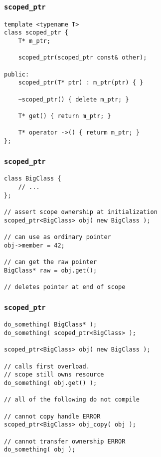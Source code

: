 \begin{frame}[fragile]
    \frametitle{\texttt{scoped\_ptr}}
    \begin{lstlisting}[title=Implementation]
template <typename T>
class scoped_ptr {
    T* m_ptr;

    scoped_ptr(scoped_ptr const& other);

public:
    scoped_ptr(T* ptr) : m_ptr(ptr) { }

    ~scoped_ptr() { delete m_ptr; }

    T* get() { return m_ptr; }

    T* operator ->() { returm m_ptr; }
};
    \end{lstlisting}
\end{frame}

\begin{frame}[fragile]
    \frametitle{\texttt{scoped\_ptr}}
    \begin{lstlisting}[title=Usage]
class BigClass {
    // ...
};

// assert scope ownership at initialization
scoped_ptr<BigClass> obj( new BigClass );

// can use as ordinary pointer
obj->member = 42;

// can get the raw pointer
BigClass* raw = obj.get();

// deletes pointer at end of scope
    \end{lstlisting}
\end{frame}


\begin{frame}[fragile]
    \frametitle{\texttt{scoped\_ptr}}
    \begin{lstlisting}[title=Compile time enforcement]
do_something( BigClass* );
do_something( scoped_ptr<BigClass> );

scoped_ptr<BigClass> obj( new BigClass );

// calls first overload.
// scope still owns resource
do_something( obj.get() );

// all of the following do not compile

// cannot copy handle ERROR
scoped_ptr<BigClass> obj_copy( obj );

// cannot transfer ownership ERROR
do_something( obj );
    \end{lstlisting}
\end{frame}

